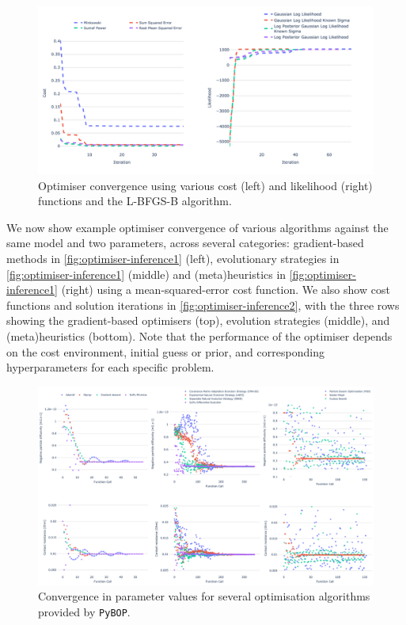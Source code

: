 \documentclass[
]{article}
\begin{document}
\begin{figure}
\centering
\includegraphics[width=1\textwidth,height=\textheight]{figures/joss/converge.png}
\caption{Optimiser convergence using various cost (left) and likelihood
(right) functions and the L-BFGS-B algorithm.
\label{fig:convergence-min-max}}
\end{figure}

We now show example optimiser convergence of various algorithms against
the same model and two parameters, across several categories:
gradient-based methods in \autoref{fig:optimiser-inference1} (left),
evolutionary strategies in \autoref{fig:optimiser-inference1} (middle)
and (meta)heuristics in \autoref{fig:optimiser-inference1} (right) using
a mean-squared-error cost function. We also show cost functions and
solution iterations in \autoref{fig:optimiser-inference2}, with the
three rows showing the gradient-based optimisers (top), evolution
strategies (middle), and (meta)heuristics (bottom). Note that the
performance of the optimiser depends on the cost environment, initial
guess or prior, and corresponding hyperparameters for each specific
problem.

\begin{figure}
\centering
\includegraphics[width=1\textwidth,height=\textheight]{figures/joss/optimisers_parameters.png}
\caption{Convergence in parameter values for several optimisation
algorithms provided by \texttt{PyBOP}. \label{fig:optimiser-inference1}}
\end{figure}
\end{document}
